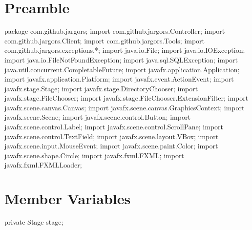 \section{Preamble}
\nwenddocs{}\endmoddef{}
package com.github.jargors;
import com.github.jargors.Controller;
import com.github.jargors.Client;
import com.github.jargors.Tools;
import com.github.jargors.exceptions.*;
\nwendcode{}\nwdocspar
\nwenddocs{}\plusendmoddef
import java.io.File;
import java.io.IOException;
import java.io.FileNotFoundException;
import java.sql.SQLException;
import java.util.concurrent.CompletableFuture;
\nwendcode{}\nwdocspar
\nwenddocs{}\plusendmoddef
import javafx.application.Application;
import javafx.application.Platform;
import javafx.event.ActionEvent;
import javafx.stage.Stage;
import javafx.stage.DirectoryChooser;
import javafx.stage.FileChooser;
import javafx.stage.FileChooser.ExtensionFilter;
import javafx.scene.canvas.Canvas;
import javafx.scene.canvas.GraphicsContext;
import javafx.scene.Scene;
import javafx.scene.control.Button;
import javafx.scene.control.Label;
import javafx.scene.control.ScrollPane;
import javafx.scene.control.TextField;
import javafx.scene.layout.VBox;
import javafx.scene.input.MouseEvent;
import javafx.scene.paint.Color;
import javafx.scene.shape.Circle;
import javafx.fxml.FXML;
import javafx.fxml.FXMLLoader;
\nwendcode{}\nwdocspar

\section{Member Variables}
\nwenddocs{}\endmoddef{}
private Stage stage;
\nwendcode{}\nwdocspar

